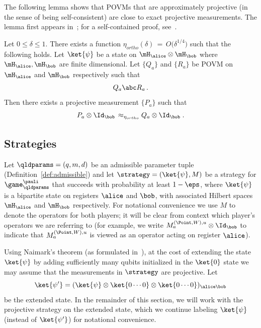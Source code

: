 The following lemma shows that POVMs that are approximately projective (in the sense of being self-consistent) are close to exact projective measurements. The lemma first appears in~\cite{KV11}; for a self-contained proof, see~\cite{ML20}.

\begin{lemma}\label{lem:ortho}
Let $0\leq \delta\leq 1$. There exists a function $\eta_{ortho}(\delta)\,=\, O\big(\delta^{1/4}\big)$ such that the following holds.  Let $\ket{\psi}$ be a state on $\mH_\alice \otimes \mH_\bob$ where $\mH_\alice,\mH_\bob$ are finite dimensional. Let $\{Q_a\}$ and $\{R_a\}$ be POVM on $\mH_\alice$ and $\mH_\bob$ respectively such that 
\begin{equation}\label{eq:cons-cond} 
Q_a \abc R_a \,.
\end{equation}
Then there exists a projective measurement $\{P_a\}$ such that
\begin{equation}\label{eq:cons-ccl}
  P_a \otimes \Id_\bob \,\approx_{\eta_{ortho}} Q_a \otimes \Id_\bob \;.
\end{equation}
\end{lemma}









 \newcommand{\acom}{\typestyle{Anticom}}

\subsection{Strategies}
\label{sec:commutation}

  Let $\qldparams = (q,m,d)$ be an admissible parameter tuple (Definition~\ref{def:admissible}) and let
  $\strategy = (\ket{\psi},M)$ be a strategy for
  $\game^\pauli_\qldparams$ that succeeds with probability at least $1 - \eps$, where $\ket{\psi}$ is a bipartite state on registers $\alice$ and $\bob$, with associated Hilbert spaces $\mH_\alice$ and $\mH_\bob$ respectively. For notational convenience we use $M$ to denote the operators for both players; it will be clear from context which player's operators we are referring to (for example, we write $M^{(\Point,W),u}_a \otimes \Id_\bob$ to indicate that $M^{(\Point,W),u}_a$ is viewed as an operator acting on register $\alice$).
  
  Using Naimark's
  theorem (as formulated in~\cite[Theorem 5.1]{ML20}), at the cost of
  extending the state $\ket{\psi}$ by adding sufficiently many qubits
  initialized in the $\ket{0}$ state we may assume
  that the measurements in $\strategy$ are projective. Let
  \[ \ket{\psi'} = (\ket{\psi} \otimes \ket{0 \cdots 0} \otimes \ket{0
      \cdots 0})_{\alice \bob} \]
  be the extended state. In the remainder of this section, we
  will work with the projective strategy on the extended state, which we continue labeling $\ket{\psi}$ (instead of $\ket{\psi'}$) for notational convenience.

